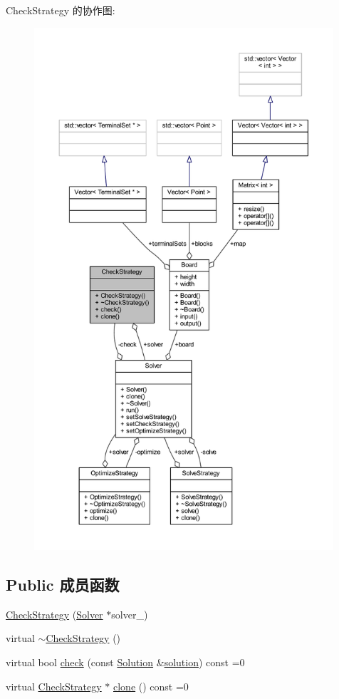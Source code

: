 Check\+Strategy 的协作图\+:
\nopagebreak
\begin{figure}[H]
\begin{center}
\leavevmode
\includegraphics[height=550pt]{classCheckStrategy__coll__graph}
\end{center}
\end{figure}
\subsection*{Public 成员函数}
\begin{DoxyCompactItemize}
\item 
\hyperlink{classCheckStrategy_afdfa5dca2aecaccd079a765a1fb52690}{Check\+Strategy} (\hyperlink{classSolver}{Solver} $\ast$solver\+\_\+)
\item 
virtual \hyperlink{classCheckStrategy_a15162688463374268c2a008ba70b7327}{$\sim$\+Check\+Strategy} ()
\item 
virtual bool \hyperlink{classCheckStrategy_a4ea49fe480604a34b1a4604f61e34b11}{check} (const \hyperlink{classSolution}{Solution} \&\hyperlink{classes_8txt_aa43d5190bbc491d9c9134146e01a248e}{solution}) const  =0
\item 
virtual \hyperlink{classCheckStrategy}{Check\+Strategy} $\ast$ \hyperlink{classCheckStrategy_ae3d41d899831bf33314db410d7f2f947}{clone} () const  =0
\end{DoxyCompactItemize}
